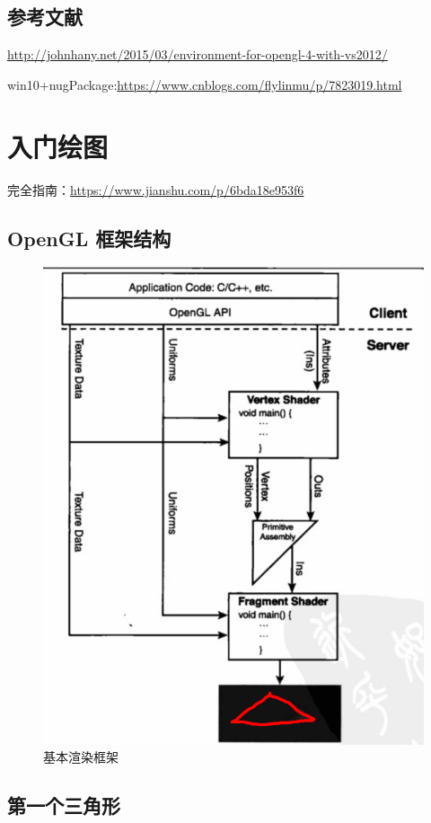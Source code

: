\documentclass[UTF8,a4paper,12pt]{ctexbook}
\begin{document}
    \section{参考文献} 
    \url{http://johnhany.net/2015/03/environment-for-opengl-4-with-vs2012/}    
    
    win10+nugPackage:\url{https://www.cnblogs.com/flylinmu/p/7823019.html}
    


\newpage
\chapter{入门绘图}
	完全指南：\url{https://www.jianshu.com/p/6bda18e953f6}

	\section{OpenGL 框架结构}
		\begin{figure}[H]
			\centering
			\includegraphics[width=.91\linewidth]{openGlArch}
			\caption{基本渲染框架}
		\end{figure}
		
	
	\section{第一个三角形}
	
\end{document}

